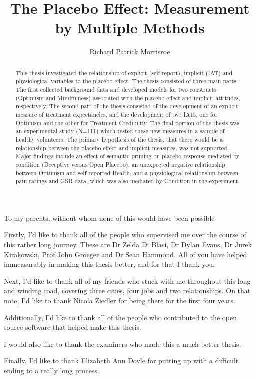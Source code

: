 \documentclass[apsych,phd]{uccthesis}
\title{The Placebo Effect: Measurement by Multiple Methods}
\author[99473437]{Richard Patrick Morrisroe}
\begin{document}







\begin{dedication}
To my parents, without whom none of this would have been possible
\end{dedication}

\begin{abstract}
  This thesis investigated the relationship of explicit (self-report), implicit (IAT) and physiological variables to the placebo effect. The thesis consisted of three main parts. The first collected background data and developed models for two constructs (Optimism and Mindfulness) associated with the placebo effect and implicit attitudes, respectively. The second part of the thesis consisted of the development of an explicit measure of treatment expectancies, and the development of two IATs, one for Optimism and the other for Treatment Credibility. The final portion of the thesis was an experimental study (N=111) which tested these new measures in a sample of healthy volunteers. The primary hypothesis of the thesis, that there would be a relationship between the placebo effect and implicit measures, was not supported. Major findings include an effect of semantic priming on placebo response mediated by condition (Deceptive versus Open Placebo), an unexpected negative relationship between Optimism and self-reported Health, and a physiological relationship between pain ratings and GSR data, which was also mediated by Condition in the experiment. 
\end{abstract}

\begin{acknowledgements}
  Firstly, I'd like to thank all of the people who supervised me over the course of this rather long journey. These are Dr Zelda Di Blasi, Dr Dylan Evans, Dr Jurek Kirakowski, Prof John Groeger and Dr Sean Hammond. All of you have helped immeasurably in making this thesis better, and for that I thank you. 

Next, I'd like to thank all of my friends who stuck with me throughout this long and winding road, covering three cities, four jobs and two relationships. On that note, I'd like to thank Nicola Ziedler for being there for the first four years. 

Additionally, I'd like to thank all of the people who contributed to the open source software that helped make this thesis. 

I would also like to thank the examiners who made this a much better thesis. 

Finally, I'd like to thank Elizabeth Ann Doyle for putting up with a difficult ending to a really long process. 
\end{acknowledgements}
\end{document}
